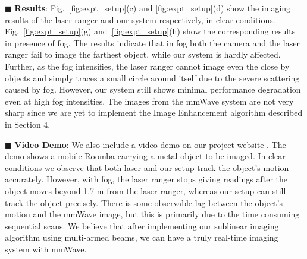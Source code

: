 \noindent $\blacksquare$ \textbf{Results}: Fig.~\ref{fig:expt_setup}(c) and \ref{fig:expt_setup}(d) show the imaging results of the laser ranger and our system respectively, in clear conditions. Fig.~\ref{fig:expt_setup}(g) and~\ref{fig:expt_setup}(h) show the corresponding results in presence of fog. The results indicate that in fog both the camera and the laser ranger fail to image the farthest object, while our system is hardly affected. 
Further, as the fog intensifies, the laser ranger cannot image even the close by objects and simply traces a small circle around itself due to the severe scattering caused by fog. However, our system still shows minimal performance degradation even at high fog intensities. The images from the mmWave system are not very sharp since we are yet to implement the Image Enhancement algorithm described in Section 4.


\noindent $\blacksquare$ \textbf{Video Demo}: We also include a video demo on our project website \cite{webpage}. The demo shows a mobile Roomba carrying a metal object to be imaged. In clear conditions we observe that both laser and our setup track the object's motion accurately. However, with fog, the laser ranger stops giving readings after the object moves beyond 1.7 m from the laser ranger, whereas our setup can still track the object precisely. There is some observable lag between the object's motion and the mmWave image, but this is primarily due to the time consuming sequential scans. We believe that after implementing our sublinear imaging algorithm using multi-armed beams, we can have a truly real-time imaging system with mmWave.




